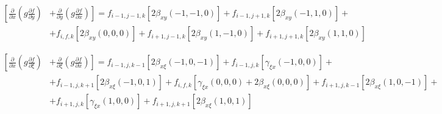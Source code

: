 \begin{equation*}
    \begin{split}
        \left[
            \frac
                {\partial}
                {\partial x}
            \left(
                g
                \frac
                    {\partial f}
                    {\partial y}
            \right)
        \right.
            &
        \left.
            +
            \frac
                {\partial}
                {\partial y}
            \left(
                g
                \frac
                    {\partial f}
                    {\partial x}
            \right)
        \right]
        =
        f_{i-1, j-1, k}
        \left[
            2
            \beta_{xy} \left(-1, -1, 0\right)
        \right]
        +
        f_{i-1, j+1, k}
        \left[
            2
            \beta_{xy} \left(-1, 1, 0\right)
        \right]
        +
        \\
        &
        +
        f_{i, f, k}
        \left[
            2
            \beta_{xy} \left(0, 0, 0\right)
        \right]
        +
        f_{i+1, j-1, k}
        \left[
            2
            \beta_{xy} \left(1, -1, 0\right)
        \right]
        +
        f_{i+1, j+1, k}
        \left[
            2
            \beta_{xy} \left(1, 1, 0\right)
        \right]
    \end{split}
\end{equation*}

\begin{equation*}
    \begin{split}
        \left[
            \frac
                {\partial}
                {\partial x}
            \left(
                g
                \frac
                    {\partial f}
                    {\partial \xi}
            \right)
        \right.
            &
        \left.
            +
            \frac
                {\partial}
                {\partial \xi}
            \left(
                g
                \frac
                    {\partial f}
                    {\partial x}
            \right)
        \right]
        =
        f_{i-1, j, k-1}
        \left[
            2
            \beta_{x\xi} \left(-1, 0, -1\right)
        \right]
        +
        f_{i-1, j, k}
        \left[
            \gamma_{\xi x} \left(-1, 0, 0\right)
        \right]
        +
        \\
        &
        +
        f_{i-1, j, k+1}
        \left[
            2
            \beta_{x\xi} \left(-1, 0, 1\right)
        \right]
        +
        f_{i, f, k}
        \left[
            \gamma_{\xi x} \left(0, 0, 0\right)
            +
            2
            \beta_{x\xi} \left(0, 0, 0\right)
        \right]
        +
        f_{i+1, j, k-1}
        \left[
            2
            \beta_{x\xi} \left(1, 0, -1\right)
        \right]
        +
        \\
        &
        +
        f_{i+1, j, k}
        \left[
            \gamma_{\xi x} \left(1, 0, 0\right)
        \right]
        +
        f_{i+1, j, k+1}
        \left[
            2
            \beta_{x\xi} \left(1, 0, 1\right)
        \right]
    \end{split}
\end{equation*}

